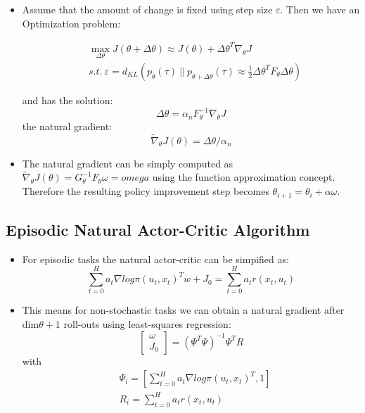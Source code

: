 {\begin{pcolumn}
{\begin{itemize}
	\item Assume that the amount of change is fixed using step size $\varepsilon$. Then we have an Optimization problem:

\begin{eqnarray}
	& \max \limits_{\Delta\theta} J(\theta + \Delta\theta) \approx J(\theta) + \Delta\theta^T \nabla_\theta J \\
	& s.t.\  \varepsilon = d_{KL}(p_\theta(\tau) \ ||\ p_{\theta+\Delta\theta} (\tau) \approx \frac{1}{2} \Delta \theta^T F_\theta \Delta \theta)   \nonumber
\end{eqnarray}

and has the solution:
\begin{equation}
	\Delta \theta = \alpha_n F_\theta^{-1}\nabla_\theta J
\end{equation}
the natural gradient:
\begin{equation}
	\widetilde \nabla_\theta J(\theta) = \Delta \theta / \alpha_n
\end{equation}
	\item The natural gradient can be simply computed as $\widetilde \nabla_\theta J(\theta) = G_\theta^{-1}F_\theta \omega = omega$ using the function approximation concept. Therefore the resulting policy improvement step becomes $\theta_{i+1} = \theta_i + \alpha\omega$.
\end{itemize}
\vspace*{2mm}
}


\end{pcolumn}
%
\hfill
\begin{pcolumn}
%
\subsection{Episodic Natural Actor-Critic Algorithm}
\vspace*{-16mm}
%
{\large
\begin{itemize}
	\item For episodic tasks the natural actor-critic can be simpified as:
\begin{equation}
	\sum_{t=0}^H a_t \nabla log \pi(u_t, x_t)^Tw + J_0 = \sum_{t=0}^H a_t r(x_t, u_t)
\end{equation}
	\item This means for non-stochastic tasks we can obtain a natural gradient after dim$\theta + 1$ roll-outs using least-squares regression:
\begin{equation}
	\left[
	\begin{matrix}
		\omega \\
		J_0
	\end{matrix}
	\right] = (\Psi^T \Psi)^{-1}\Psi^T R
\end{equation}
with
\begin{eqnarray}
	& \Psi_i = \left[\sum_{t=0}^{H}a_t \nabla log \pi (u_t, x_t)^T, 1 \right] \\
	& R_i = \sum_{t=0}^{H}a_t r(x_t, u_t)
\end{eqnarray}


\end{itemize}}
\end{pcolumn}}
